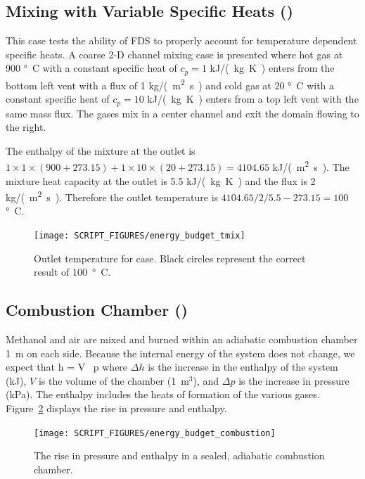 \documentclass[11pt]{book}
\begin{document}
\subsection{Mixing with Variable Specific Heats (\texorpdfstring{}{energy\_budget\_tmix})}
\label{energy_budget_tmix}

This case tests the ability of FDS to properly account for temperature dependent specific heats.  A coarse 2-D channel mixing case is presented where hot gas at 900 \si{\degree C} with a constant specific heat of $c_p=1$ \si{kJ/(kg.K)} enters from the bottom left vent with a flux of 1 \si{kg/(m^2.s)} and cold gas at 20 \si{\degree C} with a constant specific heat of $c_p=10$ \si{kJ/(kg.K)} enters from a top left vent with the same mass flux.  The gases mix in a center channel and exit the domain flowing to the right.

The enthalpy of the mixture at the outlet is $1 \times 1 \times (900+273.15) + 1 \times 10 \times (20+273.15) = 4104.65$ \si{kJ/(m^2.s)}.  The mixture heat capacity at the outlet is 5.5 \si{kJ/(kg.K)} and the flux is 2 \si{kg/(m^2.s)}.  Therefore the outlet temperature is $4104.65/2/5.5 - 273.15 = 100$ \si{\degree C}.
\begin{figure}[ht]
\centering
\texttt{[image: SCRIPT\_FIGURES/energy\_budget\_tmix]}
\caption[The  test case]{\label{fig_outlet_temperature} Outlet temperature for  case.  Black circles represent the correct result of 100~\si{\degree C}.}
\end{figure}


\subsection{Combustion Chamber (\texorpdfstring{}{energy\_budget\_combustion})}
\label{energy_budget_combustion}

Methanol and air are mixed and burned within an adiabatic combustion chamber 1~m on each side. Because the internal energy of the system does not change, we expect that
\be
\Delta h = V \, \Delta p
\ee
where $\Delta h$ is the increase in the enthalpy of the system (kJ), $V$ is the volume of the chamber (1~m$^3$), and $\Delta p$ is the increase in pressure (kPa). The enthalpy includes the heats of formation of the various gases. Figure~\ref{fig_energy_budget_combustion} displays the rise in pressure and enthalpy.
\begin{figure}[ht]
\centering
\texttt{[image: SCRIPT\_FIGURES/energy\_budget\_combustion]}
\caption[The  test case]{The rise in pressure and enthalpy in a sealed, adiabatic combustion chamber.}
\label{fig_energy_budget_combustion}
\end{figure}
\end{document}
